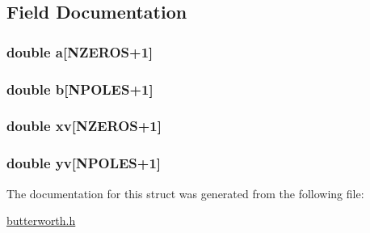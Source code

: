 \subsection{Field Documentation}
\hypertarget{struct_butterworth_data_a557bf92bd5ff8e53a9e40f1181d2917f}{
\subsubsection[{a}]{\setlength{\rightskip}{0pt plus 5cm}double a\mbox{[}{\bf N\-Z\-E\-R\-O\-S}+1\mbox{]}}}\label{struct_butterworth_data_a557bf92bd5ff8e53a9e40f1181d2917f}
\hypertarget{struct_butterworth_data_ac7faaa2c57b21f5d19544214816c4d5e}{
\subsubsection[{b}]{\setlength{\rightskip}{0pt plus 5cm}double b\mbox{[}{\bf N\-P\-O\-L\-E\-S}+1\mbox{]}}}\label{struct_butterworth_data_ac7faaa2c57b21f5d19544214816c4d5e}
\hypertarget{struct_butterworth_data_a8652f8de3a2de964a59307fe77d16ac1}{
\subsubsection[{xv}]{\setlength{\rightskip}{0pt plus 5cm}double xv\mbox{[}{\bf N\-Z\-E\-R\-O\-S}+1\mbox{]}}}\label{struct_butterworth_data_a8652f8de3a2de964a59307fe77d16ac1}
\hypertarget{struct_butterworth_data_a8de2775fdf6eb85cee7e62025805efc0}{
\subsubsection[{yv}]{\setlength{\rightskip}{0pt plus 5cm}double yv\mbox{[}{\bf N\-P\-O\-L\-E\-S}+1\mbox{]}}}\label{struct_butterworth_data_a8de2775fdf6eb85cee7e62025805efc0}


The documentation for this struct was generated from the following file\-:\begin{DoxyCompactItemize}
\item 
\hyperlink{butterworth_8h}{butterworth.\-h}\end{DoxyCompactItemize}
